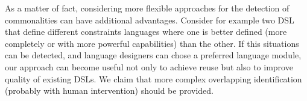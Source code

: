 As a matter of fact, considering more flexible approaches for the detection of commonalities can have additional advantages. Consider for example two DSL that define different constraints languages where one is better defined (more completely or with more powerful capabilities) than the other. If this situations can be detected, and language designers can chose a preferred language module, our approach can become useful not only to achieve reuse but also to improve quality of existing DSLs. We claim that more complex overlapping identification (probably with human intervention) should be provided.




 


